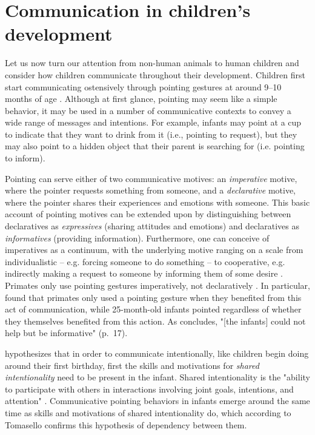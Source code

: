 \section{Communication in children's development}
\label{sec:comm:ontogeny}

Let us now turn our attention from non-human animals to human children and consider how children communicate throughout their development.
Children first start communicating ostensively through pointing gestures at around 9--10 months of age \citep[pp.~20--21 and references therein]{Carpenter98}.
Although at first glance, pointing may seem like a simple behavior, it may be used in a number of communicative contexts to convey a wide range of messages and intentions.
For example, infants may point at a cup to indicate that they want to drink from it (i.e., pointing to request), but they may also point to a hidden object that their parent is searching for (i.e. pointing to inform).

Pointing can serve either of two communicative motives: an \emph{imperative} motive, where the pointer requests something from someone, and a \emph{declarative} motive, where the pointer shares their experiences and emotions with someone.
This basic account of pointing motives can be extended upon by distinguishing between declaratives as \emph{expressives} (sharing attitudes and emotions) and declaratives as \emph{informatives} (providing information). Furthermore, one can conceive of imperatives as a continuum, with the underlying motive ranging on a scale from individualistic -- e.g. forcing someone to do something -- to cooperative, e.g. indirectly making a request to someone by informing them of some desire \citep{Tomasello08}.
Primates only use pointing gestures imperatively, not declaratively \citep{Gomez04, Tomasello05}.
In particular, \citet{Bullinger11} found that primates only used a pointing gesture when they benefited from this act of communication, while 25-month-old infants pointed regardless of whether they themselves benefited from this action. As \citet{Tomasello09} concludes, "[the infants] could not help but be informative" (p.~17).

\citet{Tomasello08} hypothesizes that in order to communicate intentionally,
like children begin doing around their first birthday, first the skills and motivations for \emph{shared intentionality} need to be present in the infant.
Shared intentionality is the "ability to participate with others in interactions involving joint goals, intentions, and attention" \citep[p.~139]{Tomasello08}. Communicative pointing behaviors in infants emerge around the same time as skills and motivations of shared intentionality do, which according to Tomasello confirms this hypothesis of dependency between them.

